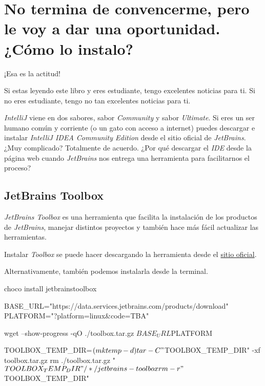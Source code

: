 \section{No termina de convencerme, pero le voy a dar una oportunidad. ¿Cómo lo instalo?}
  ¡Esa es la actitud!

  Si estas leyendo este libro y eres estudiante, tengo excelentes noticias para ti.
  Si no eres estudiante, tengo no tan excelentes noticias para ti.

  \textit{IntelliJ} viene en dos sabores, sabor \textit{Community} y sabor \textit{Ultimate}.
  Si eres un ser humano común y corriente (o un gato con acceso a internet) puedes descargar e 
  instalar \textit{IntelliJ IDEA Community Edition}\index{} desde el sitio oficial de \textit{JetBrains}.
  ¿Muy complicado?
  Totalmente de acuerdo.
  ¿Por qué descargar el \textit{IDE} desde la página web cuando \textit{JetBrains} nos entrega una
  herramienta para facilitarnos el proceso?
  
  \subsection{JetBrains Toolbox}
    \textit{JetBrains Toolbox} es una herramienta que facilita la instalación de los productos de
    \textit{JetBrains}, manejar distintos proyectos y también hace más fácil actualizar las
    herramientas.

    Instalar \textit{Toolbox} se puede hacer descargando la herramienta desde el 
    \href{https://www.jetbrains.com/toolbox-app/}{sitio oficial}.

    Alternativamente, también podemos instalarla desde la terminal.

    \begin{tcolorbox}[enhanced, breakable, title=Windows]
      \begin{powershell}
        choco install jetbrainstoolbox
      \end{powershell}
    \end{tcolorbox}
    
    \begin{tcolorbox}[enhanced, breakable, title=Linux/Mac]
      \begin{bash}
        BASE_URL="https://data.services.jetbrains.com/products/download"
        PLATFORM="?platform=linux&code=TBA"

        wget --show-progress -qO ./toolbox.tar.gz $BASE_URL$PLATFORM
        
        TOOLBOX_TEMP_DIR=$(mktemp -d)
        tar -C "$TOOLBOX_TEMP_DIR" -xf toolbox.tar.gz
        rm ./toolbox.tar.gz
        "$TOOLBOX_TEMP_DIR"/*/jetbrains-toolbox

        rm -r "$TOOLBOX_TEMP_DIR"
      \end{bash}
    \end{tcolorbox}
